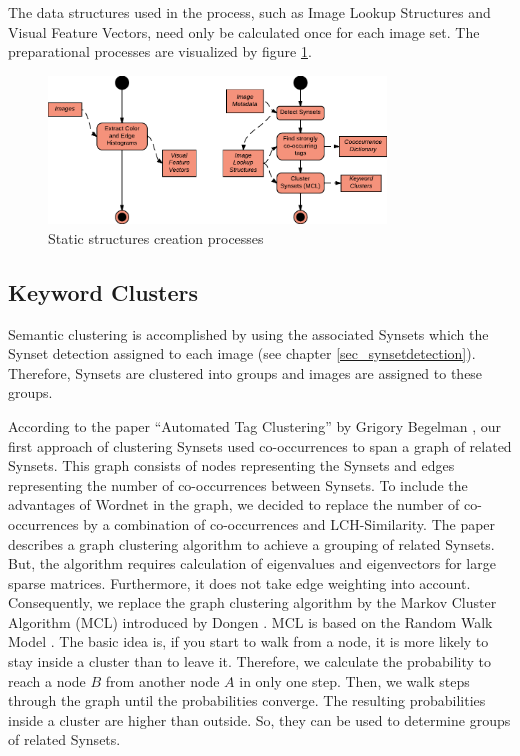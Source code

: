 The data structures used in the process, such as Image Lookup Structures and Visual Feature Vectors, need only be calculated once for each image set. The preparational processes are visualized by figure \ref{fig_precalcprocess}.

\begin{figure}[h]
\centering
\includegraphics[width=0.8\textwidth]{images/precalcs_activity_diagram.pdf}
\caption{Static structures creation processes}
\label{fig_precalcprocess}
\end{figure}


\subsection{Keyword Clusters}
\label{sec_keywordclustering}
Semantic clustering is accomplished by using the associated Synsets which the Synset detection assigned to each image (see chapter \ref{sec_synsetdetection}). Therefore, Synsets are clustered into groups and images are assigned to these groups.

\bigskip
According to the paper ``Automated Tag Clustering'' by Grigory Begelman \cite{begelman2006automated}, our first approach of clustering Synsets used co-occurrences to span a graph of related Synsets. This graph consists of nodes representing the Synsets and edges representing the number of co-occurrences between Synsets. To include the advantages of Wordnet in the graph, we decided to replace the number of co-occurrences by a combination of co-occurrences and LCH-Similarity. The paper describes a graph clustering algorithm to achieve a grouping of related Synsets. But, the algorithm requires calculation of eigenvalues and eigenvectors for large sparse matrices. Furthermore, it does not take edge weighting into account. Consequently, we replace the graph clustering algorithm by the Markov Cluster Algorithm (MCL) introduced by Dongen \cite{Dongen1998}. MCL is based on the Random Walk Model \cite{spitzer2001principles}. The basic idea is, if you start to walk from a node, it is more likely to stay inside a cluster than to leave it. Therefore, we calculate the probability to reach a node $B$ from another node $A$ in only one step. Then, we walk steps through the graph until the probabilities converge. The resulting probabilities inside a cluster are higher than outside. So, they can be used to determine groups of related Synsets.\\

